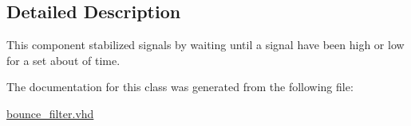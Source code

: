 \subsection{Detailed Description}
This component stabilized signals by waiting until a signal have been high or low for a set about of time. 

The documentation for this class was generated from the following file\-:\begin{DoxyCompactItemize}
\item 
\hyperlink{bounce__filter_8vhd}{bounce\-\_\-filter.\-vhd}\end{DoxyCompactItemize}
